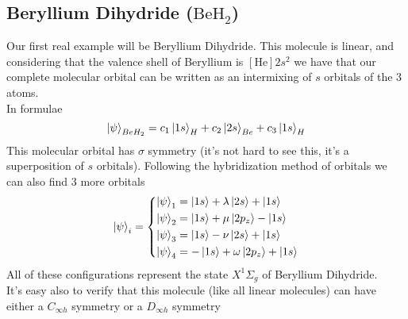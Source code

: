 \documentclass[../qm.tex]{subfiles}
\begin{document}
	\subsection{Beryllium Dihydride ($\mathrm{BeH_2}$)}
	Our first real example will be Beryllium Dihydride. This molecule is linear, and considering that the valence shell of Beryllium is $[\mathrm{He}]2s^2$ we have that our complete molecular orbital can be written as an intermixing of $s$ orbitals of the 3 atoms.\\
	In formulae
	\begin{equation}
		\ket{\psi}_{BeH_2}=c_1\ket{1s}_H+c_2\ket{2s}_{Be}+c_3\ket{1s}_H
		\label{eq:psibeh2}
	\end{equation}
	This molecular orbital has $\sigma$ symmetry (it's not hard to see this, it's a superposition of $s$ orbitals). Following the hybridization method of orbitals we can also find 3 more orbitals
	\begin{equation}
		\ket{\psi}_i=\left\{\begin{aligned}
			\ket{\psi}_1&=\ket{1s}+\lambda\ket{2s}+\ket{1s}\\
			\ket{\psi}_2&=\ket{1s}+\mu\ket{2p_z}-\ket{1s}\\
			\ket{\psi}_3&=\ket{1s}-\nu\ket{2s}+\ket{1s}\\
			\ket{\psi}_4&=-\ket{1s}+\omega\ket{2p_z}+\ket{1s}
		\end{aligned}\right.
		\label{eq:beh2orbitals}
	\end{equation}
	All of these configurations represent the state $X^1\Sigma_g$ of Beryllium Dihydride.\\
	It's easy also to verify that this molecule (like all linear molecules) can have either a $C_{\infty h}$ symmetry or a $D_{\infty h}$ symmetry
\end{document}
